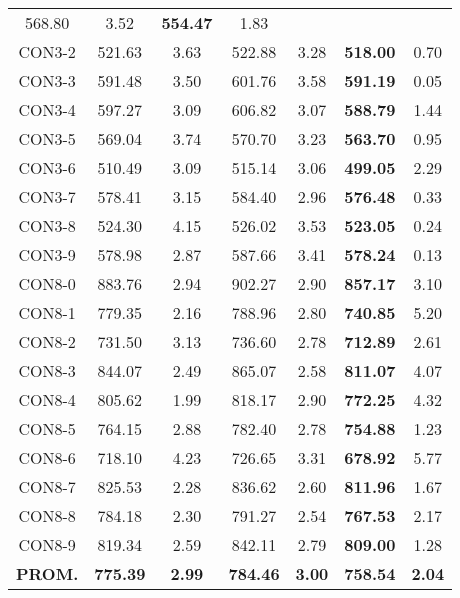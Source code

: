 \begin{table}[ht]
\begin{tabular}{c c c c c c c}
568.80 & 3.52 & \bf{554.47} & 
1.83\\CON3-2 & 521.63 & 3.63 & 
522.88 & 3.28 & \bf{518.00} & 
0.70\\CON3-3 & 591.48 & 3.50 & 
601.76 & 3.58 & \bf{591.19} & 
0.05\\CON3-4 & 597.27 & 3.09 & 
606.82 & 3.07 & \bf{588.79} & 
1.44\\CON3-5 & 569.04 & 3.74 & 
570.70 & 3.23 & \bf{563.70} & 
0.95\\CON3-6 & 510.49 & 3.09 & 
515.14 & 3.06 & \bf{499.05} & 
2.29\\CON3-7 & 578.41 & 3.15 & 
584.40 & 2.96 & \bf{576.48} & 
0.33\\CON3-8 & 524.30 & 4.15 & 
526.02 & 3.53 & \bf{523.05} & 
0.24\\CON3-9 & 578.98 & 2.87 & 
587.66 & 3.41 & \bf{578.24} & 
0.13\\CON8-0 & 883.76 & 2.94 & 
902.27 & 2.90 & \bf{857.17} & 
3.10\\CON8-1 & 779.35 & 2.16 & 
788.96 & 2.80 & \bf{740.85} & 
5.20\\CON8-2 & 731.50 & 3.13 & 
736.60 & 2.78 & \bf{712.89} & 
2.61\\CON8-3 & 844.07 & 2.49 & 
865.07 & 2.58 & \bf{811.07} & 
4.07\\CON8-4 & 805.62 & 1.99 & 
818.17 & 2.90 & \bf{772.25} & 
4.32\\CON8-5 & 764.15 & 2.88 & 
782.40 & 2.78 & \bf{754.88} & 
1.23\\CON8-6 & 718.10 & 4.23 & 
726.65 & 3.31 & \bf{678.92} & 
5.77\\CON8-7 & 825.53 & 2.28 & 
836.62 & 2.60 & \bf{811.96} & 
1.67\\CON8-8 & 784.18 & 2.30 & 
791.27 & 2.54 & \bf{767.53} & 
2.17\\CON8-9 & 819.34 & 2.59 & 
842.11 & 2.79 & \bf{809.00} & 
1.28\\\bf{PROM.} & 
\bf{775.39} & \bf{2.99} & \bf{784.46} & \bf{3.00} & \bf{758.54} & \bf{2.04}\\[1ex]\hline
\end{tabular}
\label{table:nonlin}
\end{table} \clearpage
